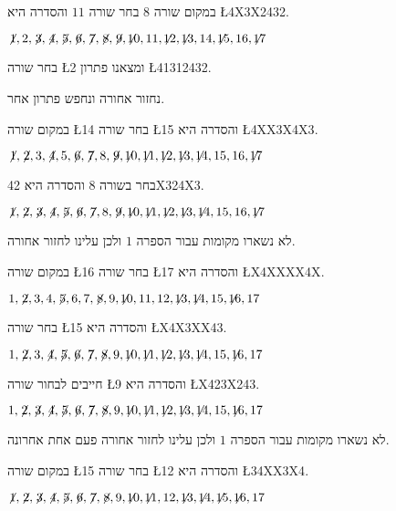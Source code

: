 \noindent 
במקום שורה $8$ בחר שורה $11$ והסדרה היא
\L{4X3X2432}.


$\not\! 1,2,\not\! 3,\not\! 4,\not\! 5,\not\! 6,\not\! 7,\not\! 8,\not\! 9,\not\!\! 10,11,\not\!\! 12,\not\!\! 13,14, \not\!\! 15,16,\not\!\! 17$

\noindent
בחר שורה
\L{2}
ומצאנו פתרון
\L{41312432}.

\smallskip

\noindent
נחזור אחורה ונחפש פתרון אחר.

\smallskip

\noindent
במקום שורה
\L{14}
בחר שורה
\L{15}
והסדרה היא
\L{4XX3X4X3}.

$\not\! 1,\not\! 2,3,\not\! 4,5,\not\! 6,\not\! 7,8,\not\! 9,\not\!\! 10,\not\!\! 11,\not\!\! 12,\not\!\! 13,\not\!\! 14,15,16,\not\!\! 17$

\noindent 
בחר בשורה 8 והסדרה היא
42X324X3.

$\not\! 1,\not\! 2,\not\! 3,\not\! 4,\not\! 5,\not\! 6,\not\! 7,8,\not\! 9,\not\!\! 10,\not\!\! 11,\not\!\! 12,\not\!\! 13,\not\!\! 14,15,16,\not\!\! 17$

לא נשארו מקומות עבור הספרה $1$ ולכן עלינו לחזור אחורה.

\smallskip

\noindent
במקום שורה
\L{16}
בחר שורה
\L{17}
והסדרה היא
\L{X4XXXX4X}.

$1,\not\! 2,3,4,\not\! 5,6,7,\not\! 8,9,\not\!\! 10,11,12,\not\!\! 13,\not\!\! 14,15,\not\!\! 16,17$

\noindent 
בחר שורה
\L{15}
והסדרה היא
\L{X4X3XX43}.

$1,\not\! 2,3,\not\! 4,\not\! 5,\not\! 6,\not\! 7,\not\! 8,9,\not\!\! 10,\not\!\! 11,\not\!\! 12,\not\!\! 13,\not\!\! 14,15,\not\!\! 16,17$

\noindent 
חייבים לבחור שורה
\L{9}
והסדרה היא
\L{X423X243}.

$1,\not\! 2,\not\! 3,\not\! 4,\not\! 5,\not\! 6,\not\! 7,\not\! 8,9,\not\!\! 10,\not\!\! 11,\not\!\! 12,\not\!\! 13,\not\!\! 14,15,\not\!\! 16,17$

\noindent
לא נשארו מקומות עבור הספרה $1$ ולכן עלינו לחזור אחורה פעם אחת אחרונה.

\smallskip

\noindent
במקום שורה
\L{15}
בחר שורה
\L{12}
והסדרה היא
\L{34XX3X4}.

$\not\! 1,\not\! 2,\not\! 3,\not\! 4,\not\! 5,\not\! 6,\not\! 7,\not\! 8,9,\not\!\! 10,\not\!\! 11,12,\not\!\! 13,\not\!\! 14,\not\!\! 15,\not\!\! 16,17$

